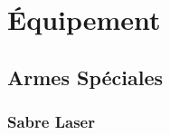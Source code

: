 \section{\'Equipement}

\subsection{Armes Spéciales}

\subsubsection{Sabre Laser}
\label{sec:sabre-laser}